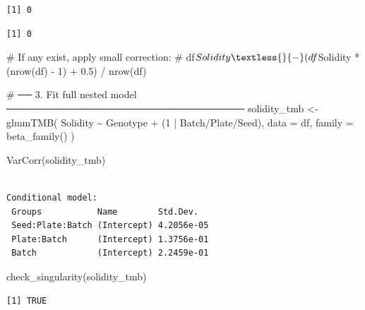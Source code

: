 \documentclass[
  letterpaper,
  DIV=11,
  numbers=noendperiod]{scrartcl}
\newenvironment{Shaded}{\begin{snugshade}}{\end{snugshade}}
\newcommand{\AttributeTok}[1]{\textcolor[rgb]{0.40,0.45,0.13}{#1}}
\newcommand{\CommentTok}[1]{\textcolor[rgb]{0.37,0.37,0.37}{#1}}
\newcommand{\DecValTok}[1]{\textcolor[rgb]{0.68,0.00,0.00}{#1}}
\newcommand{\FunctionTok}[1]{\textcolor[rgb]{0.28,0.35,0.67}{#1}}
\newcommand{\NormalTok}[1]{\textcolor[rgb]{0.00,0.23,0.31}{#1}}
\newcommand{\OtherTok}[1]{\textcolor[rgb]{0.00,0.23,0.31}{#1}}
\newcommand{\SpecialCharTok}[1]{\textcolor[rgb]{0.37,0.37,0.37}{#1}}
\begin{document}
\begin{verbatim}
[1] 0
\end{verbatim}

\begin{Shaded}
\end{Shaded}

\begin{verbatim}
[1] 0
\end{verbatim}

\begin{Shaded}
\begin{Highlighting}[]
\CommentTok{\# If any exist, apply small correction:}
\CommentTok{\# df$Solidity \textless{}{-} (df$Solidity * (nrow(df) {-} 1) + 0.5) / nrow(df)}


\CommentTok{\# ── 3. Fit full nested model ──────────────────────────────────}
\NormalTok{solidity\_tmb }\OtherTok{\textless{}{-}} \FunctionTok{glmmTMB}\NormalTok{(}
\NormalTok{  Solidity }\SpecialCharTok{\textasciitilde{}}\NormalTok{ Genotype }\SpecialCharTok{+}\NormalTok{ (}\DecValTok{1} \SpecialCharTok{|}\NormalTok{ Batch}\SpecialCharTok{/}\NormalTok{Plate}\SpecialCharTok{/}\NormalTok{Seed),}
  \AttributeTok{data =}\NormalTok{ df, }\AttributeTok{family =} \FunctionTok{beta\_family}\NormalTok{()}
\NormalTok{)}

\FunctionTok{VarCorr}\NormalTok{(solidity\_tmb)}
\end{Highlighting}
\end{Shaded}

\begin{verbatim}

Conditional model:
 Groups           Name        Std.Dev.  
 Seed:Plate:Batch (Intercept) 4.2056e-05
 Plate:Batch      (Intercept) 1.3756e-01
 Batch            (Intercept) 2.2459e-01
\end{verbatim}

\begin{Shaded}
\begin{Highlighting}[]
\FunctionTok{check\_singularity}\NormalTok{(solidity\_tmb)}
\end{Highlighting}
\end{Shaded}

\begin{verbatim}
[1] TRUE
\end{verbatim}
\end{document}
